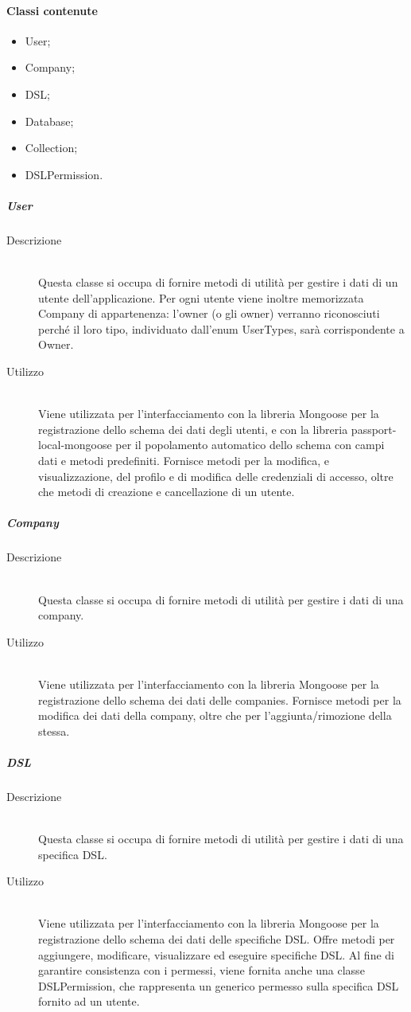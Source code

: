 \paragraph{Classi contenute}
\begin{itemize}
\item User;
\item Company;
\item DSL;
\item Database;
\item Collection;
\item DSLPermission.
\end{itemize}
\subparagraph{User}
\begin{description}
\item[Descrizione] \hfill \\
Questa classe si occupa di fornire metodi di utilità per gestire i dati di un utente dell'applicazione. Per ogni utente viene inoltre memorizzata Company di appartenenza: l'owner (o gli owner) verranno riconosciuti perché il loro tipo, individuato dall'enum UserTypes, sarà corrispondente a Owner.
\item[Utilizzo] \hfill \\
Viene utilizzata per l’interfacciamento con la libreria Mongoose per la registrazione dello schema dei dati degli utenti, e con la libreria passport-local-mongoose per il popolamento automatico dello schema con campi dati e metodi predefiniti. Fornisce metodi per la modifica, e visualizzazione, del profilo e di modifica delle credenziali di accesso, oltre che metodi di creazione e cancellazione di un utente.
\end{description}
\subparagraph{Company}
\begin{description}
\item[Descrizione] \hfill \\
Questa classe si occupa di fornire metodi di utilità per gestire i dati di una company.
\item[Utilizzo] \hfill \\
Viene utilizzata per l’interfacciamento con la libreria Mongoose per la registrazione dello schema dei dati delle companies. Fornisce metodi per la modifica dei dati della company, oltre che per l'aggiunta/rimozione della stessa.
\end{description}
\subparagraph{DSL}
\begin{description}
\item[Descrizione] \hfill \\
Questa classe si occupa di fornire metodi di utilità per gestire i dati di una specifica DSL.
\item[Utilizzo] \hfill \\
Viene utilizzata per l’interfacciamento con la libreria Mongoose per la registrazione dello schema dei dati delle specifiche DSL. Offre metodi per aggiungere, modificare, visualizzare ed eseguire specifiche DSL. Al fine di garantire consistenza con i permessi, viene fornita anche una classe DSLPermission, che rappresenta un generico permesso sulla specifica DSL fornito ad un utente.
\end{description}
